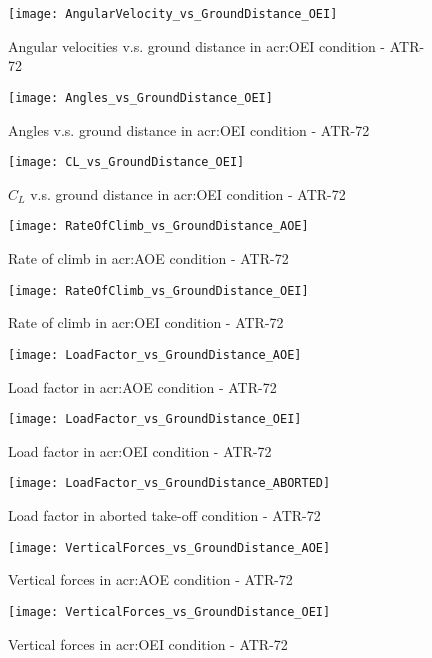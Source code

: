 %
\begin{figure}[H]
\centering
\texttt{[image: AngularVelocity\_vs\_GroundDistance\_OEI]}
\caption{Angular velocities v.s. ground distance in \gls{acr:OEI} condition - ATR-72}
\end{figure}
%
\begin{figure}[H]
\centering
\texttt{[image: Angles\_vs\_GroundDistance\_OEI]}
\caption{Angles v.s. ground distance in \gls{acr:OEI} condition - ATR-72}
\end{figure}
%
\begin{figure}[H]
\centering
\texttt{[image: CL\_vs\_GroundDistance\_OEI]}
\caption{$C_L$ v.s. ground distance in \gls{acr:OEI} condition - ATR-72}
\end{figure}
%
\begin{figure}[!t]
\centering
\texttt{[image: RateOfClimb\_vs\_GroundDistance\_AOE]}
\caption{Rate of climb in \gls{acr:AOE} condition - ATR-72}
\end{figure}
%
\begin{figure}[!b]
\centering
\texttt{[image: RateOfClimb\_vs\_GroundDistance\_OEI]}
\caption{Rate of climb in \gls{acr:OEI} condition - ATR-72}
\end{figure}
%
\clearpage
%
\begin{figure}[H]
\centering
\texttt{[image: LoadFactor\_vs\_GroundDistance\_AOE]}
\caption{Load factor in \gls{acr:AOE} condition - ATR-72}
\end{figure}
%
\begin{figure}[H]
\centering
\texttt{[image: LoadFactor\_vs\_GroundDistance\_OEI]}
\caption{Load factor in \gls{acr:OEI} condition - ATR-72}
\end{figure}
%
\begin{figure}[H]
\centering
\texttt{[image: LoadFactor\_vs\_GroundDistance\_ABORTED]}
\caption{Load factor in aborted take-off condition - ATR-72}
\end{figure}
%
\begin{figure}[H]
\centering
\texttt{[image: VerticalForces\_vs\_GroundDistance\_AOE]}
\caption{Vertical forces in \gls{acr:AOE} condition - ATR-72}
\end{figure}
%
\begin{figure}[H]
\centering
\texttt{[image: VerticalForces\_vs\_GroundDistance\_OEI]}
\caption{Vertical forces in \gls{acr:OEI} condition - ATR-72}
\end{figure}
